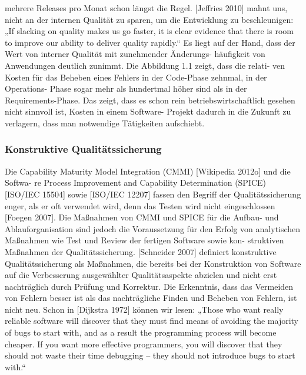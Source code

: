 mehrere Releases pro Monat schon längst die Regel.
[Jeffries 2010] mahnt uns, nicht an der internen Qualität zu sparen, um die Entwicklung zu
beschleunigen:
„If slacking on quality makes us go faster, it is clear evidence that there is room to
improve our ability to deliver quality rapidly.“
Es liegt auf der Hand, dass der Wert von interner Qualität mit zunehmender Änderungs-
häufigkeit von Anwendungen deutlich zunimmt. Die Abbildung 1.1 zeigt, dass die relati-
ven Kosten für das Beheben eines Fehlers in der Code-Phase zehnmal, in der Operations-
Phase sogar mehr als hundertmal höher sind als in der Requirements-Phase. Das zeigt, dass 
es schon rein betriebswirtschaftlich gesehen nicht sinnvoll ist, Kosten in einem Software-
Projekt dadurch in die Zukunft zu verlagern, dass man notwendige Tätigkeiten aufschiebt.

\subsubsection{Konstruktive Qualitätssicherung}
Die Capability Maturity Model Integration (CMMI) [Wikipedia 2012o] und die Softwa-
re Process Improvement and Capability Determination (SPICE) [ISO/IEC 15504] sowie
[ISO/IEC 12207] fassen den Begriff der Qualitätssicherung enger, als er oft verwendet wird,
denn das Testen wird nicht eingeschlossen [Foegen 2007]. Die Maßnahmen von CMMI
und SPICE für die Aufbau- und Ablauforganisation sind jedoch die Voraussetzung für den
Erfolg von analytischen Maßnahmen wie Test und Review der fertigen Software sowie kon-
struktiven Maßnahmen der Qualitätssicherung. [Schneider 2007] definiert konstruktive
Qualitätssicherung als Maßnahmen, die bereits bei der Konstruktion von Software auf die
Verbesserung ausgewählter Qualitätsaspekte abzielen und nicht erst nachträglich durch
Prüfung und Korrektur.
Die Erkenntnis, dass das Vermeiden von Fehlern besser ist als das nachträgliche Finden
und Beheben von Fehlern, ist nicht neu. Schon in [Dijkstra 1972] können wir lesen:
„Those who want really reliable software will discover that they must find means of
avoiding the majority of bugs to start with, and as a result the programming process
will become cheaper. If you want more effective programmers, you will discover that
they should not waste their time debugging – they should not introduce bugs to start
with.“

